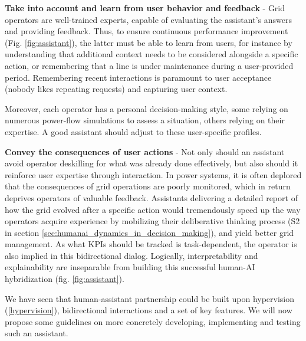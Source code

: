 \documentclass{IOS-Book-Article}
\begin{document}
\textbf{Take into account and learn from user behavior and feedback} - Grid operators are well-trained experts, capable of evaluating the assistant's answers and providing feedback. Thus, to ensure continuous performance improvement (Fig. \ref{fig:assistant}), the latter must be able to learn from users, for instance by understanding that additional context needs to be considered alongside a specific action, or remembering that a line is under maintenance during a user-provided period. Remembering recent interactions is paramount to user acceptance (nobody likes repeating requests) and capturing user context. 

Moreover, each operator has a personal decision-making style, some relying on numerous power-flow simulations to assess a situation, others relying on their expertise. A good assistant should adjust to these user-specific profiles. %


\textbf{Convey the consequences of user actions} - Not only should an assistant avoid operator deskilling for what was already done effectively, but also should it reinforce user expertise through interaction. In power systems, it is often deplored that the consequences of grid operations are poorly monitored, which in return deprives operators of valuable feedback. Assistants delivering a detailed report of how the grid evolved after a specific action would tremendously speed up the way operators acquire experience by mobilizing their deliberative thinking process (S2 in section \ref{sec:humanai_dynamics_in_decision_making}), and yield better grid management. As what KPIs should be tracked is task-dependent, the operator is also implied in this bidirectional dialog. Logically, interpretability and explainability are inseparable from building this successful human-AI hybridization (fig. \ref{fig:assistant}).




We have seen that human-assistant partnership could be built upon hypervision (\ref{hypervision}), bidirectional interactions and a set of key features. We will now propose some guidelines on more concretely developing, implementing and testing such an assistant.
\vspace{-0.5cm}
\end{document}
